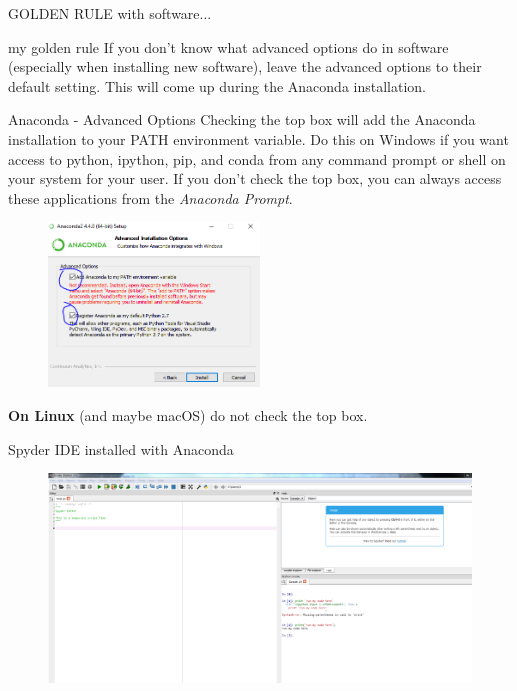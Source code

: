 \documentclass[10pt]{beamer}
\begin{document}
\begin{frame}{GOLDEN RULE with software...}
	\begin{alertblock}{my golden rule}
If you don't know what advanced options do in software (especially when installing new software), leave the advanced options to their default setting. This will come up during the Anaconda installation.
	\end{alertblock}
\end{frame}

\begin{frame}{Anaconda - Advanced Options}
Checking the top box will add the Anaconda installation to your PATH environment variable. Do this on Windows if you want access to python, ipython, pip, and conda from any command prompt or shell on your system for your user. If you don't check the top box, you can always access these applications from the \textit{Anaconda Prompt}.

\begin{figure}
 	\includegraphics[width=0.5\textwidth]{pythonInstall/anacondaCheck.png}
\end{figure}

\textbf{On Linux} (and maybe macOS) do not check the top box.
\end{frame}

\begin{frame}{Spyder IDE installed with Anaconda}
          \begin{figure} 	
 	\includegraphics[width=1.0\textwidth]{figs/spyder.png}
      \end{figure}
\end{frame}
\end{document}
